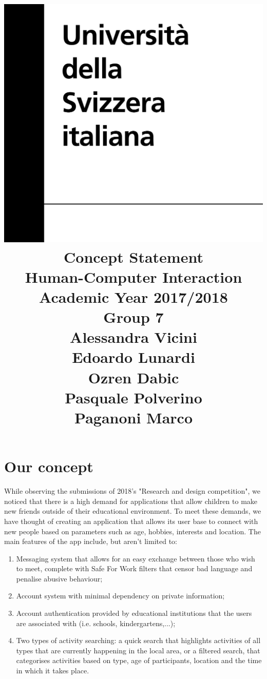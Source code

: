 \documentclass[12pt]{article}
\title {
	\includegraphics[width = .2\linewidth]{University-of-Lugano.png} \break \break
	{\bf\Huge Concept Statement}
	\\\large Human-Computer Interaction
	\\\small Academic Year 2017/2018 \break
	\\\large \textbf{Group 7}
	\\\large Alessandra Vicini \\ Edoardo Lunardi \\ Ozren Dabic \\ Pasquale Polverino \\ Paganoni Marco}
\begin{document}
	
	\maketitle
	\newpage
	
	\part*{Our concept}
	While observing the submissions of 2018's "Research and design competition", we noticed that there is a high demand for applications that allow children to make new friends outside of their educational environment. To meet these demands, we have thought of creating an application that allows its user base to connect with new people based on parameters such as age, hobbies, interests and location. The main features of the app include, but aren't limited to:
	\begin{enumerate}
		\item Messaging system that allows for an easy exchange between those who wish to meet, complete with Safe For Work filters that censor bad language and penalise abusive behaviour;
		\item Account system with minimal dependency on private information;
		\item Account authentication provided by educational institutions that the users are associated with (i.e. schools, kindergartens,...);
		\item Two types of activity searching: a quick search that highlights activities of all types that are currently happening in the local area, or a filtered search, that categorises activities based on type, age of participants, location and the time in which it takes place. 
	\end{enumerate}
	
	
\end{document}
